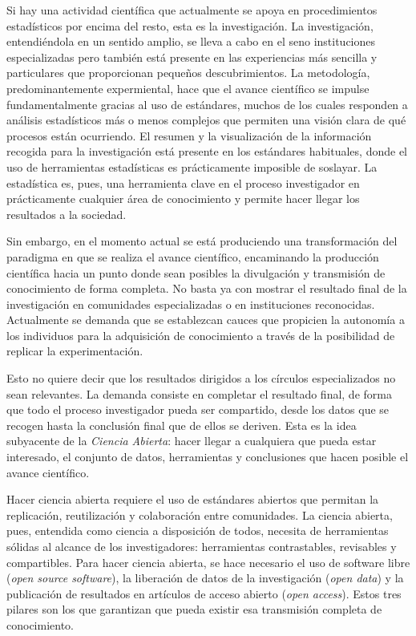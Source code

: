 \documentclass[10pt,twoside,spanish]{article}
\numberwithin{equation}{section}
\begin{document}

Si hay una actividad científica que actualmente se apoya en procedimientos estadísticos por encima del resto, esta es la investigación. La investigación, entendiéndola en un sentido amplio, se lleva a cabo en el seno  instituciones especializadas pero también está presente en las experiencias más sencilla y particulares que proporcionan pequeños descubrimientos. La metodología, predominantemente expermiental, hace que el avance científico se impulse fundamentalmente gracias al uso de estándares, muchos de los cuales responden a análisis estadísticos más o menos complejos que permiten una visión clara de qué procesos están ocurriendo. 
El resumen y la visualización de la información recogida para la investigación está presente en los estándares habituales, donde el uso de herramientas estadísticas es prácticamente imposible de soslayar.
La estadística es, pues, una herramienta clave en el proceso investigador en prácticamente cualquier área de conocimiento y permite hacer llegar los resultados a la sociedad. 

Sin embargo, en el momento actual se está produciendo una transformación del paradigma en que se realiza el avance científico, encaminando la producción científica hacia un punto donde sean posibles la divulgación y transmisión de conocimiento de forma completa. No basta ya con mostrar el resultado final de la investigación en comunidades especializadas o en instituciones reconocidas. Actualmente se  demanda que se establezcan cauces que propicien la autonomía a los individuos para la adquisición de conocimiento a través de la posibilidad de replicar la experimentación. 

Esto no quiere decir que los resultados dirigidos a los círculos especializados no sean relevantes. La demanda consiste en completar el resultado final, de forma que todo el proceso investigador pueda ser compartido, desde los datos que se recogen hasta la conclusión final que de ellos se deriven. Esta es la idea subyacente de la {\em Ciencia Abierta}:  hacer llegar a cualquiera que pueda estar interesado, el conjunto de datos, herramientas y conclusiones que hacen posible el avance científico. 

Hacer ciencia abierta requiere el uso de estándares abiertos que permitan la replicación, reutilización y colaboración entre comunidades. La ciencia abierta, pues, entendida como ciencia a disposición de  todos, necesita de herramientas sólidas al alcance de los investigadores: herramientas contrastables, revisables y compartibles. Para hacer ciencia abierta, se hace necesario el uso de software libre ({\em open source software}), la liberación de datos de la investigación ({\em open data}) y la publicación de resultados en artículos de acceso abierto ({\em open access}). Estos tres pilares son los que garantizan que pueda existir esa transmisión completa de conocimiento.
\end{document}
